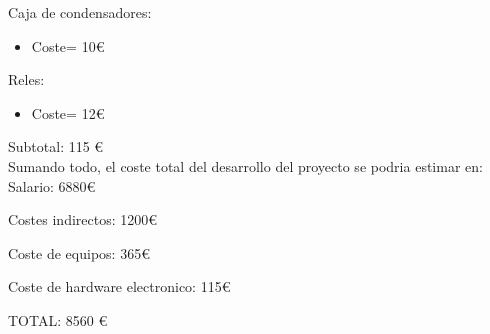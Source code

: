 \begin{titlepage}
Caja de condensadores:
\begin{itemize}
	\item Coste=  10\euro  
\end{itemize}

Reles:
\begin{itemize}
	\item Coste=  12\euro  
\end{itemize}

Subtotal: 115 \euro \\

Sumando todo, el coste total del desarrollo del proyecto se podria estimar en: \\

Salario: 6880\euro

Costes indirectos: 1200\euro

Coste de equipos: 365\euro

Coste de hardware electronico: 115\euro

TOTAL: 8560 \euro


\end{titlepage}
